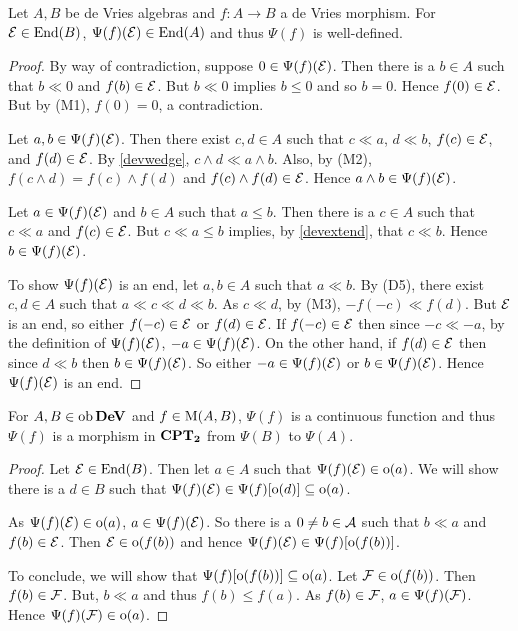 \begin{theorem}
	Let \( A,B \) be de Vries algebras and \( f:A \to B \) a de Vries morphism.  For \( \mathcal{E} \in \operatorname{End}(B) \), \( \Psi(f)(\mathcal{E}) \in \operatorname{End}(A) \) and thus \( \Psi(f) \) is well-defined.
\end{theorem}
\begin{proof}
	By way of contradiction, suppose \( 0 \in \Psi(f)(\mathcal{E}) \).  Then there is a \( b \in A \) such that \( b \ll 0 \) and \( f(b) \in \mathcal{E} \).  But \( b \ll 0 \) implies \( b \leq 0 \) and so \( b = 0 \).  Hence \( f(0) \in \mathcal{E} \).  But by (M1), \( f(0) = 0 \), a contradiction.
	
	Let \( a,b \in \Psi(f)(\mathcal{E}) \).  Then there exist \( c,d \in A \) such that \( c \ll a \), \( d \ll b \), \( f(c) \in \mathcal{E} \), and \( f(d) \in \mathcal{E} \).  By \ref{devwedge}, \( c \wedge d \ll a \wedge b \).  Also, by (M2), \( f(c \wedge d) = f(c) \wedge f(d) \) and \( f(c) \wedge f(d) \in \mathcal{E} \).  Hence \( a \wedge b \in \Psi(f)(\mathcal{E}) \).
	
	Let \( a \in \Psi(f)(\mathcal{E}) \) and \( b \in A \) such that \( a \leq b \).  Then there is a \( c \in A \) such that \( c \ll a \) and \( f(c) \in \mathcal{E} \).  But \( c \ll a \leq b \) implies, by \ref{devextend}, that \( c \ll b \).  Hence \( b \in \Psi(f)(\mathcal{E}) \).
	
	To show \( \Psi(f)(\mathcal{E}) \) is an end, let \( a,b \in A \) such that \( a \ll b \).  By (D5), there exist \( c,d \in A \) such that \( a \ll c \ll d \ll b \).  As \( c \ll d \), by (M3), \( -f(-c) \ll f(d) \).  But \( \mathcal{E} \) is an end, so either \( f(-c) \in \mathcal{E} \) or \( f(d) \in \mathcal{E} \).  If \( f(-c) \in \mathcal{E} \) then since \( -c \ll -a \), by the definition of \( \Psi(f)(\mathcal{E}) \), \( -a \in \Psi(f)(\mathcal{E}) \).  On the other hand, if \( f(d) \in \mathcal{E} \) then since \( d \ll b \) then \( b \in \Psi(f)(\mathcal{E}) \).  So either \( -a \in \Psi(f)(\mathcal{E}) \) or \( b \in \Psi(f)(\mathcal{E}) \).  Hence \( \Psi(f)(\mathcal{E}) \) is an end.
\end{proof}

\begin{theorem}
	For \( A,B \in \operatorname{ob}{\bf{DeV}} \) and \( f \in \operatorname{M}(A,B) \), \( \Psi(f) \) is a continuous function and thus \( \Psi(f) \) is a morphism in \( \bf{CPT}_\mathbf{2} \) from \( \Psi(B) \) to \( \Psi(A) \).
\end{theorem}
\begin{proof}
	Let \( \mathcal{E} \in \operatorname{End}(B) \).  Then let \( a \in A \) such that \( \Psi(f)(\mathcal{E}) \in \operatorname{o}(a) \).  We will show there is a \( d \in B \) such that \( \Psi(f)(\mathcal{E}) \in \Psi(f)[\operatorname{o}(d)] \subseteq \operatorname{o}(a) \).
	
	As \( \Psi(f)(\mathcal{E}) \in \operatorname{o}(a) \), \( a \in \Psi(f)(\mathcal{E}) \).  So there is a \( 0 \neq b \in \mathcal{A} \) such that \( b \ll a \) and \( f(b) \in \mathcal{E} \).  Then \( \mathcal{E} \in \operatorname{o}(f(b)) \) and hence \( \Psi(f)(\mathcal{E}) \in \Psi(f)[\operatorname{o}(f(b))] \).
	
	To conclude, we will show that \( \Psi(f)[\operatorname{o}(f(b))] \subseteq \operatorname{o}(a) \).  Let \( \mathcal{F} \in \operatorname{o}(f(b)) \).  Then \( f(b) \in \mathcal{F} \).  But, \( b \ll a \) and thus \( f(b) \leq f(a) \).  As \( f(b) \in \mathcal{F} \), \( a \in \Psi(f)(\mathcal{F}) \).  Hence \( \Psi(f)(\mathcal{F}) \in \operatorname{o}(a) \).
\end{proof}

